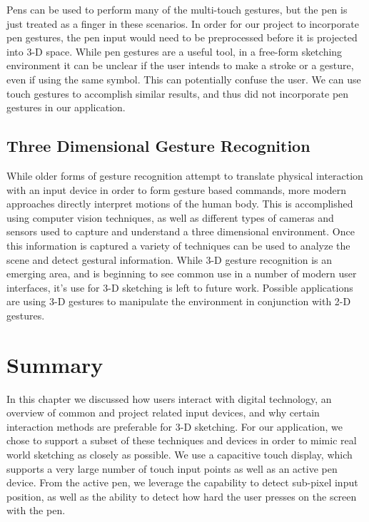 Pens can be used to perform many of the multi-touch gestures, but the pen is just treated as a finger in these scenarios.
In order for our project to incorporate pen gestures, the pen input would need to be preprocessed before it is projected into 3-D space.
While pen gestures are a useful tool, in a free-form sketching environment it can be unclear if the user intends to make a stroke or a gesture, even if using the same symbol.
This can potentially confuse the user.
We can use touch gestures to accomplish similar results, and thus did not incorporate pen gestures in our application.




\subsection{Three Dimensional Gesture Recognition}

While older forms of gesture recognition attempt to translate physical interaction with an input device in order to form gesture based commands, more modern approaches directly interpret motions of the human body.
This is accomplished using computer vision techniques, as well as different types of cameras and sensors used to capture and understand a three dimensional environment.
Once this information is captured a variety of techniques can be used to analyze the scene and detect gestural information. 
While 3-D gesture recognition is an emerging area, and is beginning to see common use in a number of modern user interfaces, it's use for 3-D sketching is left to future work.
Possible applications are using 3-D gestures to manipulate the environment in conjunction with 2-D gestures.

\section{Summary}
In this chapter we discussed how users interact with digital technology, an overview of common and project related input devices, and why certain interaction methods are preferable for 3-D sketching.
For our application, we chose to support a subset of these techniques and devices in order to mimic real world sketching as closely as possible.
We use a capacitive touch display, which supports a very large number of touch input points as well as an active pen device.
From the active pen, we leverage the capability to detect sub-pixel input position, as well as the ability to detect how hard the user presses on the screen with the pen.